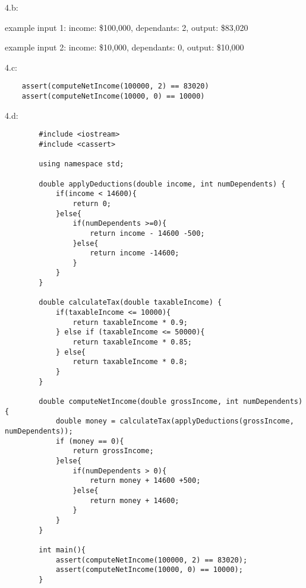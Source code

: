 \documentclass{article}
\begin{document}
\vspace{0.25cm}
\hspace{0.25cm}4.b:

    example input 1: income: \$100,000, dependants: 2, output: \$83,020

    example input 2: income: \$10,000, dependants: 0, output: \$10,000

    \hspace{0.25cm}4.c:

\begin{verbatim}
    assert(computeNetIncome(100000, 2) == 83020)
    assert(computeNetIncome(10000, 0) == 10000)
\end{verbatim}

\vspace{0.25cm}

\hspace{0.25cm}4.d:

\begin{verbatim}
        #include <iostream>
        #include <cassert>
        
        using namespace std;
        
        double applyDeductions(double income, int numDependents) {
            if(income < 14600){
                return 0;
            }else{
                if(numDependents >=0){
                    return income - 14600 -500;
                }else{
                    return income -14600;
                }
            }
        }
        
        double calculateTax(double taxableIncome) {
            if(taxableIncome <= 10000){
                return taxableIncome * 0.9;
            } else if (taxableIncome <= 50000){
                return taxableIncome * 0.85;
            } else{
                return taxableIncome * 0.8;
            }
        }
        
        double computeNetIncome(double grossIncome, int numDependents) {
            double money = calculateTax(applyDeductions(grossIncome, numDependents));
            if (money == 0){
                return grossIncome;
            }else{
                if(numDependents > 0){
                    return money + 14600 +500;
                }else{
                    return money + 14600;
                }
            }
        }
        
        int main(){
            assert(computeNetIncome(100000, 2) == 83020);
            assert(computeNetIncome(10000, 0) == 10000);
        }
\end{verbatim}
\end{document}
